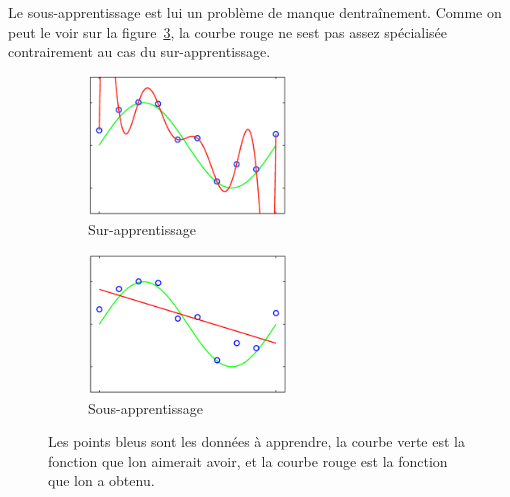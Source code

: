 \documentclass[11pt]{sdm}
\begin{document}
			Le sous-apprentissage est lui un probl\`eme de manque d\textquotesingle entra\^inement. Comme on peut le voir sur la figure~\ref{fig:underfitting}, la courbe rouge ne s\textquotesingle est pas assez sp\'ecialis\'ee contrairement au cas du sur-apprentissage.


			\begin{figure}[!ht]
				\centering
				\begin{subfigure}{0.45\textwidth}
					\centering
					\includegraphics[natwidth=489,natheight=346,width=200,height=140]{figures/overfitting.png}
					\caption{Sur-apprentissage}
					\label{fig:overfitting}
				\end{subfigure}
				\hspace*{\fill}
				\begin{subfigure}{0.45\textwidth}	
					\centering
					\includegraphics[natwidth=508,natheight=360,width=200,height=140]{figures/underfitting.png}
					\caption{Sous-apprentissage}
					\label{fig:underfitting}
				\end{subfigure}
				\caption{Les points bleus sont les donn\'ees \`a apprendre, la courbe verte est la fonction que l\textquotesingle on aimerait avoir, et la courbe rouge est la fonction que l\textquotesingle on a obtenu.}
			\end{figure}
\end{document}
